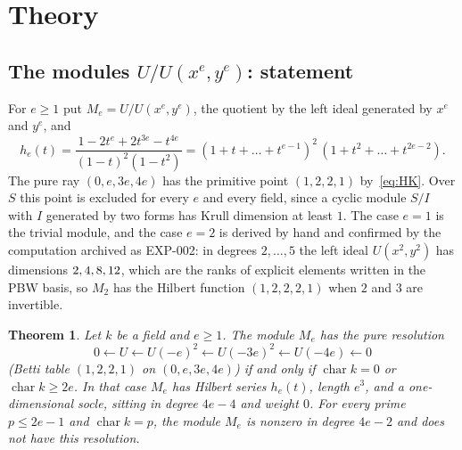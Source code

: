 \documentclass[11pt]{article}
\newtheorem{thmletter}{Theorem}
\theoremstyle{definition}
\theoremstyle{remark}
\newcommand{\EXP}[1]{\mbox{EXP-#1}}
\newcommand{\ch}{\operatorname{char}}
\begin{document}
\begin{table}[htbp]
\centering\footnotesize

\caption{Procedures of the methods section, the arithmetic domain of each, and the measured cost read from the archived records of the computations; the census was not timed separately and appears without a figure.}
\label{tab:procedures}
\end{table}

\FloatBarrier
\section{Theory}
\label{sec:theory}

\subsection{The modules \texorpdfstring{$U/U(x^e,y^e)$}{U/U(xe,ye)}: statement}
\label{sec:thmA}

For $e\ge1$ put $M_e=U/U(x^e,y^e)$, the quotient by the left ideal generated by $x^e$ and $y^e$, and
\begin{equation}\label{eq:he}
h_e(t)=\frac{1-2t^e+2t^{3e}-t^{4e}}{(1-t)^2(1-t^2)}=(1+t+\dots+t^{e-1})^2\,(1+t^2+\dots+t^{2e-2}).
\end{equation}
The pure ray $(0,e,3e,4e)$ has the primitive point $(1,2,2,1)$ by~\eqref{eq:HK}. Over $S$ this point is excluded for every $e$ and every field, since a cyclic module $S/I$ with $I$ generated by two forms has Krull dimension at least $1$. The case $e=1$ is the trivial module, and the case $e=2$ is derived by hand and confirmed by the computation archived as \EXP{002}: in degrees $2,\dots,5$ the left ideal $U(x^2,y^2)$ has dimensions $2, 4, 8, 12$, which are the ranks of explicit elements written in the PBW basis, so $M_2$ has the Hilbert function $(1,2,2,2,1)$ when $2$ and $3$ are invertible.

\begin{thmletter}\label{thm:A}
Let $k$ be a field and $e\ge1$. The module $M_e$ has the pure resolution
\[
0\leftarrow U\leftarrow U(-e)^2\leftarrow U(-3e)^2\leftarrow U(-4e)\leftarrow0
\]
(Betti table $(1,2,2,1)$ on $(0,e,3e,4e)$) if and only if $\ch k=0$ or $\ch k\ge 2e$. In that case $M_e$ has Hilbert series $h_e(t)$, length $e^3$, and a one-dimensional socle, sitting in degree $4e-4$ and weight $0$. For every prime $p\le2e-1$ and $\ch k=p$, the module $M_e$ is nonzero in degree $4e-2$ and does not have this resolution.
\end{thmletter}
\end{document}
